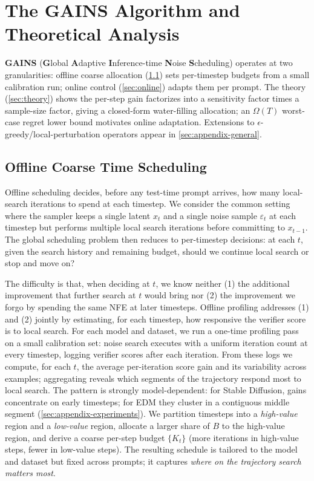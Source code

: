 \section{The \textsc{GAINS} Algorithm and Theoretical Analysis}
\label{sec:algorithm}

\textbf{\textsc{GAINS}} (\textbf{G}lobal \textbf{A}daptive \textbf{I}nference-time \textbf{N}oise \textbf{S}cheduling) operates at two granularities: offline coarse allocation (\cref{sec:offline}) sets per-timestep budgets from a small calibration run; online control (\cref{sec:online}) adapts them per prompt. The theory (\cref{sec:theory}) shows the per-step gain factorizes into a sensitivity factor times a sample-size factor, giving a closed-form water-filling allocation; an $\Omega(T)$ worst-case regret lower bound motivates online adaptation. Extensions to $\epsilon$-greedy/local-perturbation operators appear in \cref{sec:appendix-general}.

\subsection{Offline Coarse Time Scheduling}
\label{sec:offline}

Offline scheduling decides, before any test-time prompt arrives, how many local-search iterations to spend at each timestep. We consider the common setting where the sampler keeps a single latent $x_t$ and a single noise sample $\varepsilon_t$ at each timestep but performs multiple local search iterations before committing to $x_{t-1}$. The global scheduling problem then reduces to per-timestep decisions: at each $t$, given the search history and remaining budget, should we continue local search or stop and move on?

The difficulty is that, when deciding at $t$, we know neither (1) the additional improvement that further search at $t$ would bring nor (2) the improvement we forgo by spending the same NFE at later timesteps. Offline profiling addresses (1) and (2) jointly by estimating, for each timestep, how responsive the verifier score is to local search. For each model and dataset, we run a one-time profiling pass on a small calibration set: noise search executes with a uniform iteration count at every timestep, logging verifier scores after each iteration. From these logs we compute, for each $t$, the average per-iteration score gain and its variability across examples; aggregating reveals which segments of the trajectory respond most to local search. The pattern is strongly model-dependent: for Stable Diffusion, gains concentrate on early timesteps; for EDM they cluster in a contiguous middle segment (\cref{sec:appendix-experiments}). We partition timesteps into a \emph{high-value} region and a \emph{low-value} region, allocate a larger share of $B$ to the high-value region, and derive a coarse per-step budget $\{K_t\}$ (more iterations in high-value steps, fewer in low-value steps). The resulting schedule is tailored to the model and dataset but fixed across prompts; it captures \emph{where on the trajectory search matters most}.


